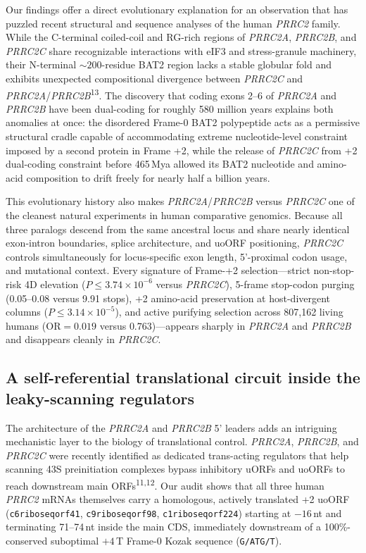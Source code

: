 \documentclass[10pt,letterpaper]{article}
\newcommand{\gene}[1]{\textit{#1}}
\newcommand{\refsup}[1]{\textsuperscript{#1}}
\begin{document}
Our findings offer a direct evolutionary explanation for an observation that has puzzled recent structural and sequence analyses of the human \gene{PRRC2} family. While the C-terminal coiled-coil and RG-rich regions of \gene{PRRC2A}, \gene{PRRC2B}, and \gene{PRRC2C} share recognizable interactions with eIF3 and stress-granule machinery, their N-terminal $\sim 200$-residue BAT2 region lacks a stable globular fold and exhibits unexpected compositional divergence between \gene{PRRC2C} and \gene{PRRC2A}/\gene{PRRC2B}\refsup{13}. The discovery that coding exons 2--6 of \gene{PRRC2A} and \gene{PRRC2B} have been dual-coding for roughly 580 million years explains both anomalies at once: the disordered Frame-0 BAT2 polypeptide acts as a permissive structural cradle capable of accommodating extreme nucleotide-level constraint imposed by a second protein in Frame +2, while the release of \gene{PRRC2C} from +2 dual-coding constraint before 465\,Mya allowed its BAT2 nucleotide and amino-acid composition to drift freely for nearly half a billion years.

This evolutionary history also makes \gene{PRRC2A}/\gene{PRRC2B} versus \gene{PRRC2C} one of the cleanest natural experiments in human comparative genomics. Because all three paralogs descend from the same ancestral locus and share nearly identical exon-intron boundaries, splice architecture, and uoORF positioning, \gene{PRRC2C} controls simultaneously for locus-specific exon length, 5'-proximal codon usage, and mutational context. Every signature of Frame-+2 selection---strict non-stop-risk 4D elevation ($P \le 3.74 \times 10^{-6}$ versus \gene{PRRC2C}), 5-frame stop-codon purging (0.05--0.08 versus 9.91 stops), +2 amino-acid preservation at host-divergent columns ($P \le 3.14 \times 10^{-5}$), and active purifying selection across 807,162 living humans ($\text{OR} = 0.019$ versus $0.763$)---appears sharply in \gene{PRRC2A} and \gene{PRRC2B} and disappears cleanly in \gene{PRRC2C}.

\subsection{A self-referential translational circuit inside the leaky-scanning regulators}

The architecture of the \gene{PRRC2A} and \gene{PRRC2B} 5' leaders adds an intriguing mechanistic layer to the biology of translational control. \gene{PRRC2A}, \gene{PRRC2B}, and \gene{PRRC2C} were recently identified as dedicated trans-acting regulators that help scanning 43S preinitiation complexes bypass inhibitory uORFs and uoORFs to reach downstream main ORFs\refsup{11,12}. Our audit shows that all three human \gene{PRRC2} mRNAs themselves carry a homologous, actively translated +2 uoORF (\texttt{c6riboseqorf41}, \texttt{c9riboseqorf98}, \texttt{c1riboseqorf224}) starting at $-16$\,nt and terminating 71--74\,nt inside the main CDS, immediately downstream of a 100\%-conserved suboptimal $+4$\,T Frame-0 Kozak sequence (\texttt{G/ATG/T}).
\end{document}
